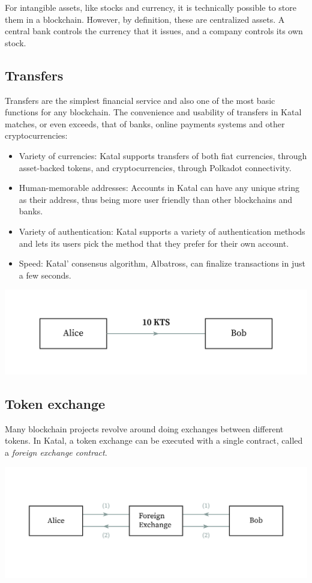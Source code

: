 \documentclass[conference]{IEEEtran}
\begin{document}
For intangible assets, like stocks and currency, it is technically possible to store them in a blockchain. However, by definition, these are centralized assets. A central bank controls the currency that it issues, and a company controls its own stock.

\subsection{Transfers}
Transfers are the simplest financial service and also one of the most basic functions for any blockchain. The convenience and usability of transfers in Katal matches, or even exceeds, that of banks, online payments systems and other cryptocurrencies:

\begin{itemize}
	\item Variety of currencies: Katal supports transfers of both fiat currencies, through asset-backed tokens, and cryptocurrencies, through Polkadot connectivity.
	\item Human-memorable addresses: Accounts in Katal can have any unique string as their address, thus being more user friendly than other blockchains and banks.
	\item Variety of authentication: Katal supports a variety of authentication methods and lets its users pick the method that they prefer for their own account.
	\item Speed: Katal' consensus algorithm, Albatross, can finalize transactions in just a few seconds.
\end{itemize}

\includegraphics[width=\linewidth]{images/transfer.jpg}

\subsection{Token exchange}
Many blockchain projects revolve around doing exchanges between different tokens. In Katal, a token exchange can be executed with a single contract, called a \textit{foreign exchange contract}.

\includegraphics[width=\linewidth]{images/token_exchange.jpg}
\end{document}
